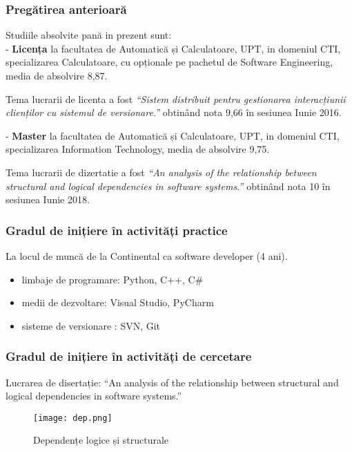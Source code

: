 \documentclass{beamer}
\begin{document}
 \begin{frame}
\frametitle{Pregătirea anterioară}

Studiile absolvite pană in prezent sunt:\\
- \textbf{Licența} la facultatea de Automatică și Calculatoare, UPT, in domeniul CTI, specializarea Calculatoare, cu opționale pe pachetul de Software Engineering, media de absolvire 8,87.

Tema lucrarii de licenta a fost \textit{“Sistem distribuit pentru gestionarea interacțiunii clienților cu sistemul de versionare.”} obtinând nota 9,66  în sesiunea Iunie 2016.

- \textbf{Master} la facultatea de Automatică și Calculatoare, UPT, in domeniul CTI, specializarea Information Technology, media de absolvire 9,75. 

Tema lucrarii de dizertatie a fost \textit{“An analysis of the relationship between structural and logical dependencies in software systems.”} obtinând nota 10 în sesiunea Iunie 2018.

\end{frame}

 \begin{frame}
\frametitle{Gradul de inițiere în activități practice}
\begin{block}{}
La locul de muncă de la Continental ca software developer (4 ani). 
\end{block}
\begin{itemize}
\item limbaje de programare: Python, C++, C\#
\item medii de dezvoltare: Visual Studio, PyCharm
\item sisteme de versionare : SVN, Git
\end{itemize}


\end{frame}


 \begin{frame}
\frametitle{Gradul de inițiere în activități de cercetare}
\begin{block}{}
Lucrarea de disertație: “An analysis of the relationship between structural and logical dependencies in software systems.”
\end{block}

\begin{center}
     \begin{figure}
	\texttt{[image: dep.png]}
	\caption{\label{fig:figtool} Dependențe logice și structurale}
     \end{figure}
\end{center}
\end{frame}
\end{document}
